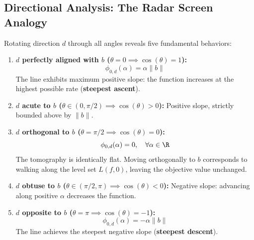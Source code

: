 \subsection{Directional Analysis: The Radar Screen Analogy}
Rotating direction $d$ through all angles reveals five fundamental behaviors:
\begin{enumerate}
    \item \textbf{$d$ perfectly aligned with $b$ ($\theta = 0 \implies \cos(\theta) = 1$):}
    \begin{equation}
    \phi_{0, d}(\alpha) = \alpha \|b\|
    \end{equation}
    The line exhibits maximum positive slope: the function increases at the highest possible rate (\textbf{steepest ascent}).
    
    \item \textbf{$d$ acute to $b$ ($\theta \in (0, \pi/2) \implies \cos(\theta) > 0$):}
    Positive slope, strictly bounded above by $\|b\|$.
    
    \item \textbf{$d$ orthogonal to $b$ ($\theta = \pi/2 \implies \cos(\theta) = 0$):}
    \begin{equation}
    \phi_{0, d}(\alpha) = 0, \quad \forall \alpha \in \R
    \end{equation}
    The tomography is identically flat. Moving orthogonally to $b$ corresponds to walking along the level set $L(f, 0)$, leaving the objective value unchanged.
    
    \item \textbf{$d$ obtuse to $b$ ($\theta \in (\pi/2, \pi) \implies \cos(\theta) < 0$):}
    Negative slope: advancing along positive $\alpha$ decreases the function.
    
    \item \textbf{$d$ opposite to $b$ ($\theta = \pi \implies \cos(\theta) = -1$):}
    \begin{equation}
    \phi_{0, d}(\alpha) = -\alpha \|b\|
    \end{equation}
    The line achieves the steepest negative slope (\textbf{steepest descent}).
\end{enumerate}

